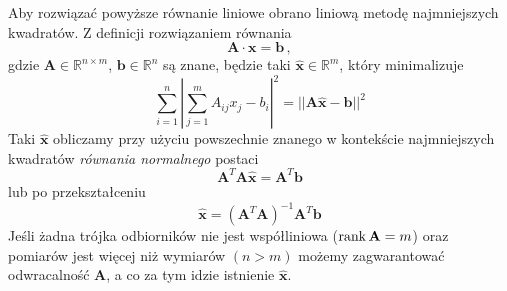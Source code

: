 Aby rozwiązać powyższe równanie liniowe obrano liniową metodę najmniejszych kwadratów. Z definicji rozwiązaniem równania
\begin{equation}
    \mathbf{A} \cdot \mathbf{x} = \mathbf{b}\,,
\end{equation}
gdzie $\mathbf{A} \in \mathbb{R}^{n\times m}$, $\mathbf{b} \in \mathbb{R}^n$ są znane, będzie taki $\hat{\mathbf{x}} \in \mathbb{R}^m$, który minimalizuje
\begin{equation}
    \sum_{i=1}^{n}{\left|\sum_{j=1}^{m}{A_{ij}x_j} - b_i\right|^2} = ||\mathbf{A}\hat{\mathbf{x}} - \mathbf{b}||^2
\end{equation}
Taki $\hat{\mathbf{x}}$ obliczamy przy użyciu powszechnie znanego w kontekście najmniejszych kwadratów \textit{równania normalnego} postaci
\begin{equation}
    \mathbf{A}^T\mathbf{A}\hat{\mathbf{x}} = \mathbf{A}^T\mathbf{b}
\end{equation}
lub po przekształceniu
\begin{equation}\label{eq:lls}
    \hat{\mathbf{x}} = {\left(\mathbf{A}^T\mathbf{A}\right)}^{-1}\mathbf{A}^T\mathbf{b}
\end{equation}
Jeśli żadna trójka odbiorników nie jest współliniowa ($\operatorname{rank}\mathbf{A} = m$) oraz pomiarów jest więcej niż wymiarów $(n > m)$ możemy zagwarantować odwracalność $\mathbf{A}$, a co za tym idzie istnienie $\hat{\mathbf{x}}$.

